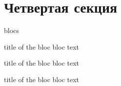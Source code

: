 \documentclass{beamer}
\begin{document}
\section{Четвертая секция}
\begin{frame}{blocs}

\begin{block}{title of the bloc}
bloc text
\end{block}

\begin{exampleblock}{title of the bloc}
bloc text
\end{exampleblock}


\begin{alertblock}{title of the bloc}
bloc text
\end{alertblock}
\end{frame}
\end{document}
